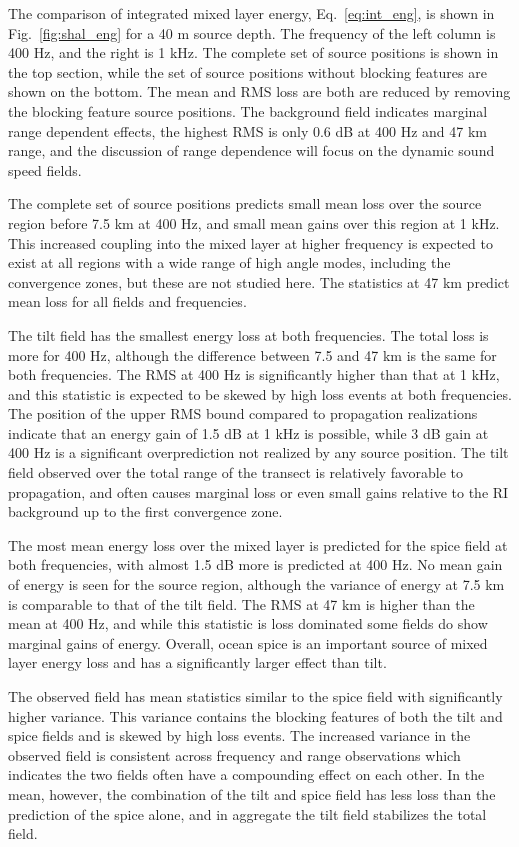 \documentclass[preprint,NumberedRefs]{JASA}
\begin{document}
The comparison of integrated mixed layer energy, Eq.~\eqref{eq:int_eng}, is shown in Fig.~\ref{fig:shal_eng} for a 40 m source depth. The frequency of the left column is 400 Hz, and the right is 1 kHz. The complete set of source positions is shown in the top section, while the set of source positions without blocking features are shown on the bottom. The mean and RMS loss are both are reduced by removing the blocking feature source positions. The background field indicates marginal range dependent effects, the highest RMS is only 0.6 dB at 400 Hz and 47 km range, and the discussion of range dependence will focus on the dynamic sound speed fields.

The complete set of source positions predicts small mean loss over the source region before 7.5 km at 400 Hz, and small mean gains over this region at 1 kHz. This increased coupling into the mixed layer at higher frequency is expected to exist at all regions with a wide range of high angle modes, including the convergence zones, but these are not studied here. The statistics at 47 km predict mean loss for all fields and frequencies.

The tilt field has the smallest energy loss at both frequencies. The total loss is more for 400 Hz, although the difference between 7.5 and 47 km is the same for both frequencies. The RMS at 400 Hz is significantly higher than that at 1 kHz, and this statistic is expected to be skewed by high loss events at both frequencies. The position of the upper RMS bound compared to propagation realizations indicate that an energy gain of 1.5 dB at 1 kHz is possible, while 3 dB gain at 400 Hz is a significant overprediction not realized by any source position. The tilt field observed over the total range of the transect is relatively favorable to propagation, and often causes marginal loss or even small gains relative to the RI background up to the first convergence zone.

The most mean energy loss over the mixed layer is predicted for the spice field at both frequencies, with almost 1.5 dB more is predicted at 400 Hz. No mean gain of energy is seen for the source region, although the variance of energy at 7.5 km is comparable to that of the tilt field. The RMS at 47 km is higher than the mean at 400 Hz, and while this statistic is loss dominated some fields do show marginal gains of energy. Overall, ocean spice is an important source of mixed layer energy loss and has a significantly larger effect than tilt.

The observed field has mean statistics similar to the spice field with significantly higher variance. This variance contains the blocking features of both the tilt and spice fields and is skewed by high loss events. The increased variance in the observed field is consistent across frequency and range observations which indicates the two fields often have a compounding effect on each other. In the mean, however, the combination of the tilt and spice field has less loss than the prediction of the spice alone, and in aggregate the tilt field stabilizes the total field.
\end{document}
